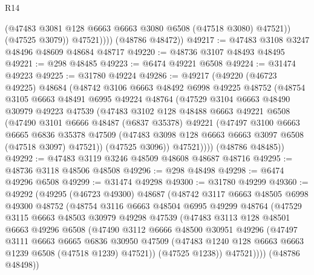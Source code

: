 \begin{lexlean}{R14}
\begin{coremodule}
                  (@47483 @3081 @128 @6663 @6663 @3080 @6508 (@47518 @3080) @47521))
                (@47525 @3079))
              @47521))))
      (@48786 @48472))
@49217 := @47483 @3108 @3247 @48496 @48609 @48684 @48717
@49220 := @48736 @3107 @48493 @48495
@49221 := @298 @48485
@49223 := @6474 @49221 @6508
@49224 := @31474 @49223
@49225 := @31780 @49224
@49286 := @49217
    (@49220
      (@46723 @49225)
      @48684
      (@48742
        @3106
        @6663
        @48492
        @6998
        @49225
        @48752
        (@48754
          @3105
          @6663
          @48491
          @6995
          @49224
          @48764
          (@47529
            @3104
            @6663
            @48490
            @30979
            @49223
            @47539
            (@47483
              @3102
              @128
              @48488
              @6663
              @49221
              @6508
              (@47490
                @3101
                @6666
                @48487
                (@6837 @35378)
                @49221
                (@47497
                  @3100
                  @6663
                  @6665
                  @6836
                  @35378
                  @47509
                  (@47483 @3098 @128 @6663 @6663 @3097 @6508 (@47518 @3097) @47521))
                (@47525 @3096))
              @47521))))
      (@48786 @48485))
@49292 := @47483 @3119 @3246 @48509 @48608 @48687 @48716
@49295 := @48736 @3118 @48506 @48508
@49296 := @298 @48498
@49298 := @6474 @49296 @6508
@49299 := @31474 @49298
@49300 := @31780 @49299
@49360 := @49292
    (@49295
      (@46723 @49300)
      @48687
      (@48742
        @3117
        @6663
        @48505
        @6998
        @49300
        @48752
        (@48754
          @3116
          @6663
          @48504
          @6995
          @49299
          @48764
          (@47529
            @3115
            @6663
            @48503
            @30979
            @49298
            @47539
            (@47483
              @3113
              @128
              @48501
              @6663
              @49296
              @6508
              (@47490
                @3112
                @6666
                @48500
                @30951
                @49296
                (@47497
                  @3111
                  @6663
                  @6665
                  @6836
                  @30950
                  @47509
                  (@47483 @1240 @128 @6663 @6663 @1239 @6508 (@47518 @1239) @47521))
                (@47525 @1238))
              @47521))))
      (@48786 @48498))

\end{coremodule}
\end{lexlean}
